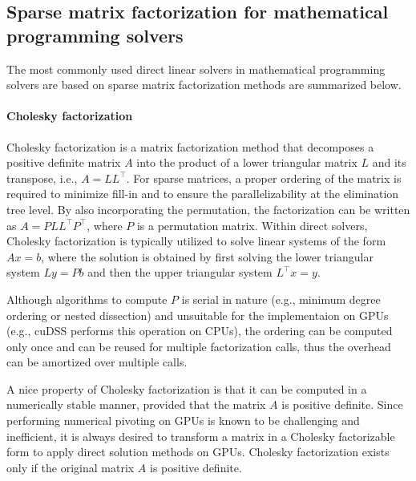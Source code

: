 \documentclass{article}
\begin{document}
\subsection{Sparse matrix factorization for mathematical programming solvers}
The most commonly used direct linear solvers in mathematical programming solvers are based on sparse matrix factorization methods are summarized below.

\paragraph{Cholesky factorization}
Cholesky factorization is a matrix factorization method that decomposes a positive definite matrix $A$ into the product of a lower triangular matrix $L$ and its transpose, i.e., $A = LL^\top$. For sparse matrices, a proper ordering of the matrix is required to minimize fill-in and to ensure the parallelizability at the elimination tree level. By also incorporating the permutation, the factorization can be written as $A = P L L^\top P^\top$, where $P$ is a permutation matrix.
Within direct solvers, Cholesky factorization is typically utilized to solve linear systems of the form $Ax = b$, where the solution is obtained by first solving the lower triangular system $Ly = Pb$ and then the upper triangular system $L^\top x = y$.

Although algorithms to compute $P$ is serial in nature (e.g., minimum degree ordering or nested dissection) and unsuitable for the implementaion on GPUs (e.g., cuDSS performs this operation on CPUs), the ordering can be computed only once and can be reused for multiple factorization calls, thus the overhead can be amortized over multiple calls.

A nice property of Cholesky factorization is that it can be computed in a numerically stable manner, provided that the matrix $A$ is positive definite.
Since performing numerical pivoting on GPUs is known to be challenging and inefficient, it is always desired to transform a matrix in a Cholesky factorizable form to apply direct solution methods on GPUs.
Cholesky factorization exists only if the original matrix $A$ is positive definite.

\end{document}
